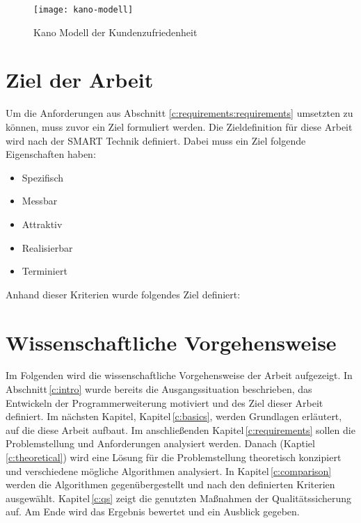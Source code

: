 \begin{figure}[h]
	\centering
	\texttt{[image: kano-modell]}
	\caption[Kano Modells]{Kano Modell der Kundenzufriedenheit}
	\label{fig:kano-model}
\end{figure}

\section{Ziel der Arbeit}
\label{c:intro:target}
Um die Anforderungen aus Abschnitt \ref{c:requirements:requirements} umsetzten zu können, muss zuvor ein Ziel formuliert werden.
Die Zieldefinition für diese Arbeit wird nach der SMART Technik definiert. Dabei muss ein Ziel folgende Eigenschaften haben:

\begin{itemize}
	\item Spezifisch
	\item Messbar
	\item Attraktiv
	\item Realisierbar
	\item Terminiert
\end{itemize}

Anhand dieser Kriterien wurde folgendes Ziel definiert:



\section{Wissenschaftliche Vorgehensweise}
\label{c:intro:methodology:scientific_proceture}
Im Folgenden wird die wissenschaftliche Vorgehensweise der Arbeit aufgezeigt.
In Abschnitt\,\ref{c:intro} wurde bereits die Ausgangssituation beschrieben, das Entwickeln der Programmerweiterung motiviert und des Ziel dieser Arbeit definiert. Im nächsten Kapitel, Kapitel\,\ref{c:basics}, werden Grundlagen erläutert, auf die diese Arbeit aufbaut. Im anschließenden Kapitel\,\ref{c:requirements} sollen die Problemstellung und Anforderungen analysiert werden. Danach (Kaptiel\,\ref{c:theoretical}) wird eine Lösung für die Problemstellung theoretisch konzipiert und verschiedene mögliche Algorithmen analysiert. In Kapitel\,\ref{c:comparison} werden die Algorithmen gegenübergestellt und nach den definierten Kriterien ausgewählt. Kapitel\,\ref{c:qs} zeigt die genutzten Maßnahmen der Qualitätssicherung auf. Am Ende wird das Ergebnis bewertet und ein Ausblick gegeben.

